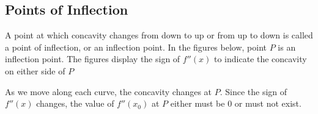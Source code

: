 \documentclass{report}
\begin{document}
\subsection*{Points of Inflection}
A point at which concavity changes from down to up or from up to down is called a point of inflection, or an inflection point. In the figures below, point $P$ is an inflection point. The figures display the sign of $f''(x)$ to indicate the concavity on either side of $P$
\bigbreak \noindent
\begin{minipage}{0.3\textwidth}
\end{minipage}
\begin{minipage}{0.3\textwidth}
\end{minipage}
\begin{minipage}{0.3\textwidth}
\end{minipage}
\bigbreak \noindent
As we move along each curve, the concavity changes at $P$. Since the sign of $f''(x)$ changes, the value of $f''(x_0)$ at $P$ either must be 0 or must not exist.
\bigbreak \noindent
{}
\end{document}
